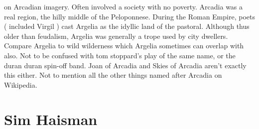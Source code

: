 \documentclass[12pt]{book}
\begin{document}
on Arcadian imagery. Often involved a society with no poverty. Arcadia was a real region, the hilly middle of the Peloponnese. During the Roman Empire, poets ( included Virgil ) cast Argelia as the idyllic land of the pastoral. Although thus older than feudalism, Argelia was generally a trope used by city dwellers. Compare Argelia to wild wilderness which Argelia sometimes can overlap with also. Not to be confused with tom stoppard's play of the same name, or the duran duran spin-off band. Joan of Arcadia and Skies of Arcadia aren't exactly this either. Not to mention all the other things named after Arcadia on Wikipedia.



\chapter{Sim Haisman}
\end{document}
